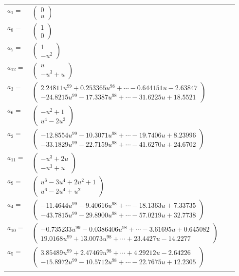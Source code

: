 \documentclass[1p]{elsarticle_modified}
\theoremstyle{definition}
\begin{document}
\begin{tabular}{m{7pt} m{180pt} m{7pt} m{180pt} }
\flushright $a_{1}=$&$\begin{pmatrix}0\\u\end{pmatrix}$ \\
\flushright $a_{8}=$&$\begin{pmatrix}1\\0\end{pmatrix}$ \\
\flushright $a_{7}=$&$\begin{pmatrix}1\\- u^2\end{pmatrix}$ \\
\flushright $a_{12}=$&$\begin{pmatrix}u\\- u^3+u\end{pmatrix}$ \\
\flushright $a_{3}=$&$\begin{pmatrix}2.24811 u^{99}+0.253365 u^{98}+\cdots-0.644151 u-2.63847\\-24.8215 u^{99}-17.3387 u^{98}+\cdots-31.6225 u+18.5521\end{pmatrix}$ \\
\flushright $a_{6}=$&$\begin{pmatrix}- u^2+1\\u^4-2 u^2\end{pmatrix}$ \\
\flushright $a_{2}=$&$\begin{pmatrix}-12.8554 u^{99}-10.3071 u^{98}+\cdots-19.7406 u+8.23996\\-33.1829 u^{99}-22.7159 u^{98}+\cdots-41.6270 u+24.6702\end{pmatrix}$ \\
\flushright $a_{11}=$&$\begin{pmatrix}- u^3+2 u\\- u^3+u\end{pmatrix}$ \\
\flushright $a_{9}=$&$\begin{pmatrix}u^6-3 u^4+2 u^2+1\\u^6-2 u^4+u^2\end{pmatrix}$ \\
\flushright $a_{4}=$&$\begin{pmatrix}-11.4644 u^{99}-9.40616 u^{98}+\cdots-18.1363 u+7.33735\\-43.7815 u^{99}-29.8900 u^{98}+\cdots-57.0219 u+32.7738\end{pmatrix}$ \\
\flushright $a_{10}=$&$\begin{pmatrix}-0.735233 u^{99}-0.0386406 u^{98}+\cdots-3.61695 u+0.645082\\19.0168 u^{99}+13.0073 u^{98}+\cdots+23.4427 u-14.2277\end{pmatrix}$ \\
\flushright $a_{5}=$&$\begin{pmatrix}3.85489 u^{99}+2.47469 u^{98}+\cdots+4.29212 u-2.64226\\-15.8972 u^{99}-10.5712 u^{98}+\cdots-22.7675 u+12.2305\end{pmatrix}$\\&\end{tabular}
\end{document}
